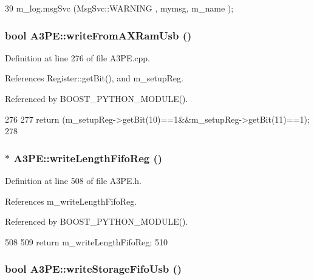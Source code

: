 \begin{DoxyCode}
39 { m_log.msgSvc (MsgSvc::WARNING , mymsg, m_name ); }
\end{DoxyCode}
\hypertarget{classA3PE_a3b4333f547a2a36fc1f38bf4ca9afa89}{
\subsubsection[{writeFromAXRamUsb}]{\setlength{\rightskip}{0pt plus 5cm}bool A3PE::writeFromAXRamUsb ()}}
\label{classA3PE_a3b4333f547a2a36fc1f38bf4ca9afa89}


Definition at line 276 of file A3PE.cpp.

References Register::getBit(), and m\_\-setupReg.

Referenced by BOOST\_\-PYTHON\_\-MODULE().


\begin{DoxyCode}
276                             {
277   return (m_setupReg->getBit(10)==1&&m_setupReg->getBit(11)==1);
278 }
\end{DoxyCode}
\hypertarget{classA3PE_a3b75531731fc939206cce076f7ac9f9a}{
\subsubsection[{writeLengthFifoReg}]{$\ast$ A3PE::writeLengthFifoReg ()}}
\label{classA3PE_a3b75531731fc939206cce076f7ac9f9a}


Definition at line 508 of file A3PE.h.

References m\_\-writeLengthFifoReg.

Referenced by BOOST\_\-PYTHON\_\-MODULE().


\begin{DoxyCode}
508                                 {
509     return m_writeLengthFifoReg;
510   }
\end{DoxyCode}
\hypertarget{classA3PE_af15048318a126074e28df1c6120d5e0d}{
\subsubsection[{writeStorageFifoUsb}]{\setlength{\rightskip}{0pt plus 5cm}bool A3PE::writeStorageFifoUsb ()}}
\label{classA3PE_af15048318a126074e28df1c6120d5e0d}


